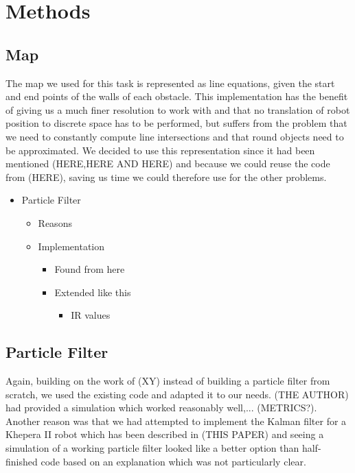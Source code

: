 \documentclass[paper=a4, fontsize=12pt]{scrartcl}	%
\numberwithin{equation}{section}		%
\numberwithin{figure}{section}			%
\numberwithin{table}{section}				%
\begin{document}
\section{Methods} 
\subsection{Map}
The map we used for this task is represented as line equations, given the start and end points of the walls of each obstacle. This implementation has the benefit of giving us a much finer resolution to work with and that no translation of robot position to discrete space has to be performed, but suffers from the problem that we need to constantly compute line intersections and that round objects need to be approximated. We decided to use this representation since it had been mentioned (HERE,HERE AND HERE) and because we could reuse the code from (HERE), saving us time we could therefore use for the other problems.

\begin{itemize}
\item Particle Filter
\begin{itemize}
\item Reasons
\item Implementation
\begin{itemize}
\item Found from here
\item Extended like this
\begin{itemize}
\item IR values
\end{itemize}
\end{itemize}
\end{itemize}
\end{itemize}

\subsection{Particle Filter}
Again, building on the work of (XY) instead of building a particle filter from scratch, we used the existing code and adapted it to our needs. (THE AUTHOR) had provided a simulation which worked reasonably well,... (METRICS?). Another reason was that we had attempted to implement the Kalman filter for a Khepera II robot which has been described in (THIS PAPER) and seeing a simulation of a working particle filter looked like a better option than half-finished code based on an explanation which was not particularly clear.
\end{document}
